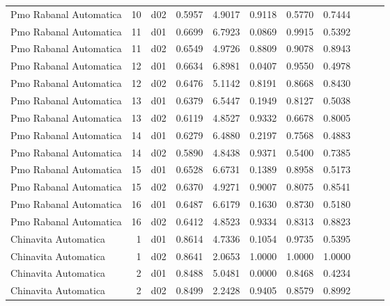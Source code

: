 \begin{landscape}
\begin{longtable}{p{2cm}rrrrrrrrrr}
 Pmo Rabanal Automatica   &         10 &     d02 &   0.5957 &  4.9017 &        0.9118 &           0.5770 &  0.7444 \\
 Pmo Rabanal Automatica   &         11 &     d01 &   0.6699 &  6.7923 &        0.0869 &           0.9915 &  0.5392 \\
 Pmo Rabanal Automatica   &         11 &     d02 &   0.6549 &  4.9726 &        0.8809 &           0.9078 &  0.8943 \\
 Pmo Rabanal Automatica   &         12 &     d01 &   0.6634 &  6.8981 &        0.0407 &           0.9550 &  0.4978 \\
 Pmo Rabanal Automatica   &         12 &     d02 &   0.6476 &  5.1142 &        0.8191 &           0.8668 &  0.8430 \\
 Pmo Rabanal Automatica   &         13 &     d01 &   0.6379 &  6.5447 &        0.1949 &           0.8127 &  0.5038 \\
 Pmo Rabanal Automatica   &         13 &     d02 &   0.6119 &  4.8527 &        0.9332 &           0.6678 &  0.8005 \\
 Pmo Rabanal Automatica   &         14 &     d01 &   0.6279 &  6.4880 &        0.2197 &           0.7568 &  0.4883 \\
 Pmo Rabanal Automatica   &         14 &     d02 &   0.5890 &  4.8438 &        0.9371 &           0.5400 &  0.7385 \\
 Pmo Rabanal Automatica   &         15 &     d01 &   0.6528 &  6.6731 &        0.1389 &           0.8958 &  0.5173 \\
 Pmo Rabanal Automatica   &         15 &     d02 &   0.6370 &  4.9271 &        0.9007 &           0.8075 &  0.8541 \\
 Pmo Rabanal Automatica   &         16 &     d01 &   0.6487 &  6.6179 &        0.1630 &           0.8730 &  0.5180 \\
 Pmo Rabanal Automatica   &         16 &     d02 &   0.6412 &  4.8523 &        0.9334 &           0.8313 &  0.8823 \\
    Chinavita Automatica  &          1 &     d01 &   0.8614 &  4.7336 &        0.1054 &           0.9735 &  0.5395 \\
    Chinavita Automatica  &          1 &     d02 &   0.8641 &  2.0653 &        1.0000 &           1.0000 &  1.0000 \\
    Chinavita Automatica  &          2 &     d01 &   0.8488 &  5.0481 &        0.0000 &           0.8468 &  0.4234 \\
    Chinavita Automatica  &          2 &     d02 &   0.8499 &  2.2428 &        0.9405 &           0.8579 &  0.8992 \\

\end{longtable}
\end{landscape}
